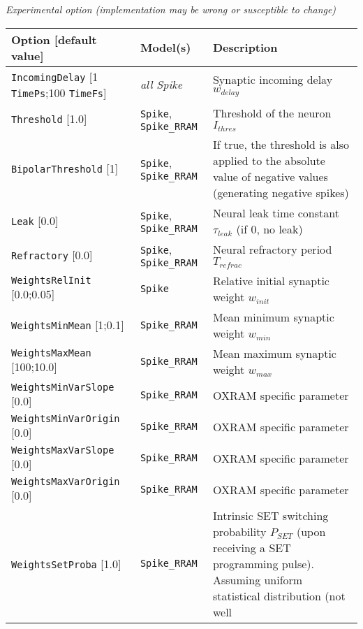 \documentclass[a4paper,11pt,oneside]{article}
\begin{document}
\begin{flushleft}
\emph{Experimental option (implementation may be wrong or susceptible
to change)}
\end{flushleft}
\begin{center}
 \begin{longtable}{| p{4cm} | p{3cm} | p{9cm} | }
 \hline
 Option [default value] & Model(s) & Description\\
 \hline\hline
  \lstinline!IncomingDelay! [1 \lstinline!TimePs!;100 \lstinline!TimeFs!]
  & \emph{all Spike} & Synaptic incoming delay $w_{delay}$ \\
  \lstinline!Threshold! [1.0] & \lstinline!Spike!, \lstinline!Spike_RRAM!
  & Threshold of the neuron $I_{thres}$ \\
  \lstinline!BipolarThreshold! [1] & \lstinline!Spike!, \lstinline!Spike_RRAM!
  & If true, the threshold is also applied to the absolute value of negative
  values (generating negative spikes) \\
  \lstinline!Leak! [0.0] & \lstinline!Spike!, \lstinline!Spike_RRAM!
  & Neural leak time constant $\tau_{leak}$ (if 0, no leak) \\
  \lstinline!Refractory! [0.0] & \lstinline!Spike!, \lstinline!Spike_RRAM!
  & Neural refractory period $T_{refrac}$ \\
  \lstinline!WeightsRelInit! [0.0;0.05] & \lstinline!Spike!
  & Relative initial synaptic weight $w_{init}$ \\
  \lstinline!WeightsMinMean! [1;0.1] & \lstinline!Spike_RRAM!
  & Mean minimum synaptic weight $w_{min}$ \\
  \lstinline!WeightsMaxMean! [100;10.0] & \lstinline!Spike_RRAM!
  & Mean maximum synaptic weight $w_{max}$ \\
  \lstinline!WeightsMinVarSlope! [0.0] & \lstinline!Spike_RRAM!
  & OXRAM specific parameter \\
  \lstinline!WeightsMinVarOrigin! [0.0] & \lstinline!Spike_RRAM!
  & OXRAM specific parameter \\
  \lstinline!WeightsMaxVarSlope! [0.0] & \lstinline!Spike_RRAM!
  & OXRAM specific parameter \\
  \lstinline!WeightsMaxVarOrigin! [0.0] & \lstinline!Spike_RRAM!
  & OXRAM specific parameter \\
  \lstinline!WeightsSetProba! [1.0] & \lstinline!Spike_RRAM!
  & Intrinsic SET switching probability $P_{SET}$ (upon receiving a SET
   programming pulse). Assuming uniform statistical distribution (not well

\end{longtable}
\end{center}
\end{document}

